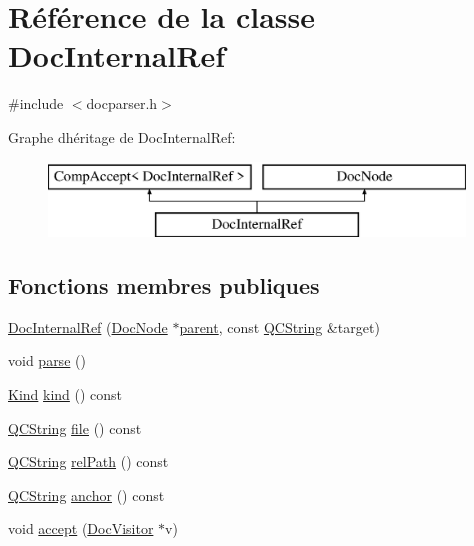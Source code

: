 \hypertarget{class_doc_internal_ref}{}\section{Référence de la classe Doc\+Internal\+Ref}
\label{class_doc_internal_ref}


{\ttfamily \#include $<$docparser.\+h$>$}

Graphe d\textquotesingle{}héritage de Doc\+Internal\+Ref\+:\begin{figure}[H]
\begin{center}
\leavevmode
\includegraphics[height=2.000000cm]{class_doc_internal_ref}
\end{center}
\end{figure}
\subsection*{Fonctions membres publiques}
\begin{DoxyCompactItemize}
\item 
\hyperlink{class_doc_internal_ref_a15b7019ec093e3e7357e368a58530efb}{Doc\+Internal\+Ref} (\hyperlink{class_doc_node}{Doc\+Node} $\ast$\hyperlink{class_doc_node_a990d8b983962776a647e6231d38bd329}{parent}, const \hyperlink{class_q_c_string}{Q\+C\+String} \&target)
\item 
void \hyperlink{class_doc_internal_ref_ab9cc38fde444889a618974f396bf36ed}{parse} ()
\item 
\hyperlink{class_doc_node_aebd16e89ca590d84cbd40543ea5faadb}{Kind} \hyperlink{class_doc_internal_ref_a996948b84815ba40e200d7c64328bde3}{kind} () const 
\item 
\hyperlink{class_q_c_string}{Q\+C\+String} \hyperlink{class_doc_internal_ref_a4e5328d5eda9f64bb7916c16dd0d9c3a}{file} () const 
\item 
\hyperlink{class_q_c_string}{Q\+C\+String} \hyperlink{class_doc_internal_ref_a49ef423c8ea2f61019c255e1d71a4254}{rel\+Path} () const 
\item 
\hyperlink{class_q_c_string}{Q\+C\+String} \hyperlink{class_doc_internal_ref_a7f1dcd091e2c30a6bbe8873c4499d059}{anchor} () const 
\item 
void \hyperlink{class_doc_internal_ref_afb9d447c755b630a33218907e01a22f3}{accept} (\hyperlink{class_doc_visitor}{Doc\+Visitor} $\ast$v)
\end{DoxyCompactItemize}
